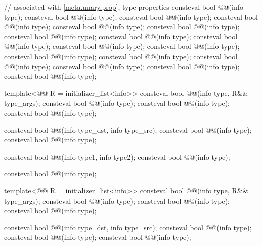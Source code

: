 \begin{codeblock}
// associated with \ref{meta.unary.prop}, type properties
consteval bool @@(info type);
consteval bool @@(info type);
consteval bool @@(info type);
consteval bool @@(info type);
consteval bool @@(info type);
consteval bool @@(info type);
consteval bool @@(info type);
consteval bool @@(info type);
consteval bool @@(info type);
consteval bool @@(info type);
consteval bool @@(info type);
consteval bool @@(info type);
consteval bool @@(info type);
consteval bool @@(info type);
consteval bool @@(info type);
consteval bool @@(info type);
consteval bool @@(info type);

template<@@ R = initializer_list<info>>
  consteval bool @@(info type, R&& type_args);
consteval bool @@(info type);
consteval bool @@(info type);
consteval bool @@(info type);

consteval bool @@(info type_dst, info type_src);
consteval bool @@(info type);
consteval bool @@(info type);

consteval bool @@(info type1, info type2);
consteval bool @@(info type);

consteval bool @@(info type);

template<@@ R = initializer_list<info>>
  consteval bool @@(info type, R&& type_args);
consteval bool @@(info type);
consteval bool @@(info type);
consteval bool @@(info type);

consteval bool @@(info type_dst, info type_src);
consteval bool @@(info type);
consteval bool @@(info type);
consteval bool @@(info type);


\end{codeblock}

